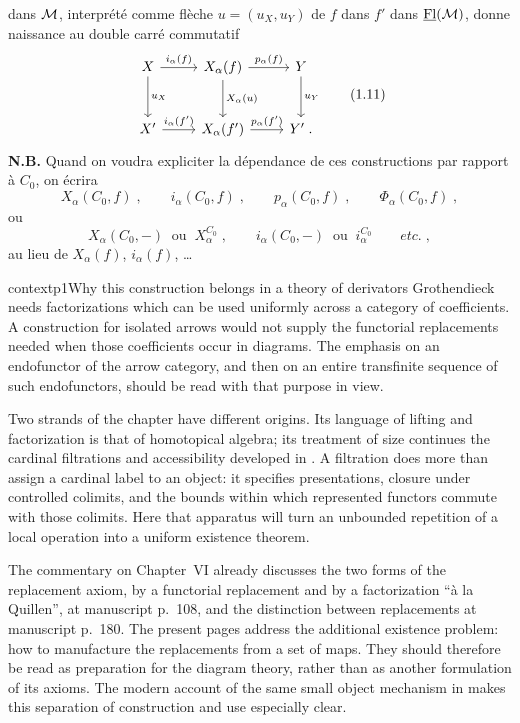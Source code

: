 dans $\mathcal{M}$, interprété comme flèche $u = (u_X, u_Y)$ de $f$ dans $f'$ dans $\underline{\mathrm{Fl}}(\mathcal{M})$, donne naissance au double carré commutatif
\[
\begin{tikzcd}[row sep=large]
X \arrow[r, "i_\alpha(f)"] \arrow[d, "u_X"] & X_\alpha(f) \arrow[r, "p_\alpha(f)"] \arrow[d, "X_\alpha(u)"] & Y \arrow[d, "u_Y"] \\
X' \arrow[r, "{i_\alpha(f')}"] & X_\alpha(f') \arrow[r, "{p_\alpha(f')}"] & Y' \;.
\end{tikzcd}
\tag*{(1.11)}
\]
\textbf{N.B.} Quand on voudra expliciter la dépendance de ces constructions par rapport à $C_0$, on écrira
\[
X_\alpha(C_0,f) \;, \qquad i_\alpha(C_0,f) \;, \qquad p_\alpha(C_0,f) \;, \qquad \Phi_\alpha(C_0,f) \;,
\]
ou
\[
X_\alpha(C_0,-) \;\;\text{ou}\;\; X_\alpha^{C_0} \;, \qquad i_\alpha(C_0,-) \;\;\text{ou}\;\; i_\alpha^{C_0} \qquad \textit{etc.} \;,
\]
au lieu de $X_\alpha(f)$, $i_\alpha(f)$, \dots

\begin{dcomment}{context}{p1}{Why this construction belongs in a theory of derivators}
Grothendieck needs factorizations which can be used uniformly across a category of coefficients. A construction for isolated arrows would not supply the functorial replacements needed when those coefficients occur in diagrams. The emphasis on an endofunctor of the arrow category, and then on an entire transfinite sequence of such endofunctors, should be read with that purpose in view.

Two strands of the chapter have different origins. Its language of lifting and factorization is that of homotopical algebra; its treatment of size continues the cardinal filtrations and accessibility developed in \citep[Expos\'e~I, \S9]{SGA4I1972}. A filtration does more than assign a cardinal label to an object: it specifies presentations, closure under controlled colimits, and the bounds within which represented functors commute with those colimits. Here that apparatus will turn an unbounded repetition of a local operation into a uniform existence theorem.

The commentary on Chapter~VI already discusses the two forms of the replacement axiom, by a functorial replacement and by a factorization ``à la Quillen'', at manuscript p.~108, and the distinction between replacements at manuscript p.~180. The present pages address the additional existence problem: how to manufacture the replacements from a set of maps. They should therefore be read as preparation for the diagram theory, rather than as another formulation of its axioms. The modern account of the same small object mechanism in \citep[Chapter~12]{Riehl2014} makes this separation of construction and use especially clear.
\end{dcomment}


